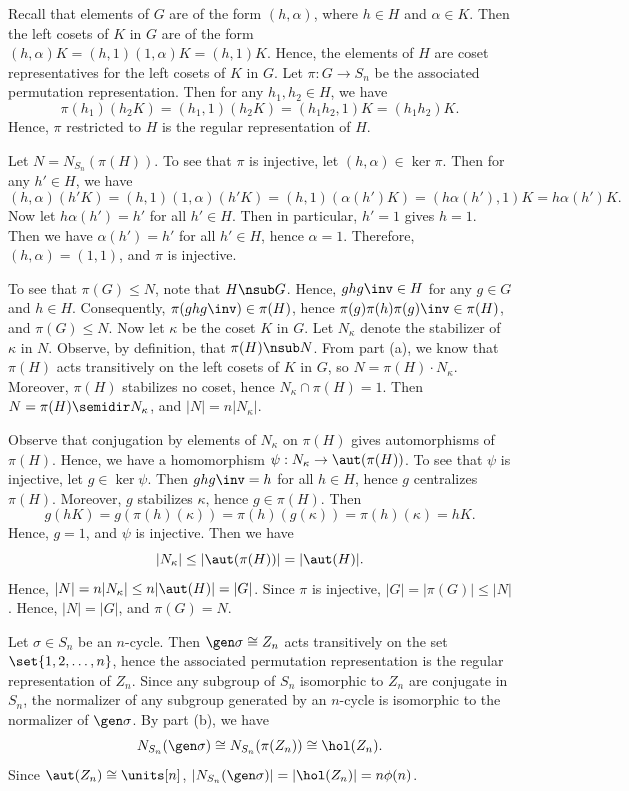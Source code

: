 \begin{solenum}
    \item Recall that elements of $G$ are of the form $(h, \alpha)$, where $h \in H$ and $\alpha \in K$.
	Then the left cosets of $K$ in $G$ are of the form $(h, \alpha)K = (h, 1)(1, \alpha)K = (h, 1)K$.
	Hence, the elements of $H$ are coset representatives for the left cosets of $K$ in $G$.
	Let $\pi : G \to S_n$ be the associated permutation representation.
	Then for any $h_1, h_2 \in H$, we have
    \[
    	\pi(h_1)(h_2K) = (h_1, 1)(h_2K) = (h_1h_2, 1)K = (h_1h_2)K.
    \]
    Hence, $\pi$ restricted to $H$ is the regular representation of $H$.
    \item Let $N = N_{S_n}(\pi(H))$.
	To see that $\pi$ is injective, let $(h, \alpha) \in \ker\pi$.
	Then for any $h' \in H$, we have
    \[
    	(h, \alpha)(h'K) = (h, 1)(1, \alpha)(h'K) = (h, 1)(\alpha(h')K) = (h\alpha(h'), 1)K = h\alpha(h')K.
    \]
    Now let $h\alpha(h') = h'$ for all $h' \in H$.
	Then in particular, $h' = 1$ gives $h = 1$.
	Then we have $\alpha(h') = h'$ for all $h' \in H$, hence $\alpha = 1$.
	Therefore, $(h, \alpha) = (1, 1)$, and $\pi$ is injective.

    To see that $\pi(G) \leq N$, note that $H \nsub G$.
	Hence, $ghg\inv \in H$ for any $g \in G$ and $h \in H$.
	Consequently, $\pi(ghg\inv) \in \pi(H)$, hence $\pi(g)\pi(h)\pi(g)\inv \in \pi(H)$, and $\pi(G) \leq N$.
	Now let $\kappa$ be the coset $K$ in $G$.
	Let $N_\kappa$ denote the stabilizer of $\kappa$ in $N$.
	Observe, by definition, that $\pi(H) \nsub N$.
	From part (a), we know that $\pi(H)$ acts transitively on the left cosets of $K$ in $G$, so $N = \pi(H) \cdot N_\kappa$.
	Moreover, $\pi(H)$ stabilizes no coset, hence $N_\kappa \cap \pi(H) = 1$.
	Then $N = \pi(H) \semidir N_\kappa$, and $|N| = n|N_\kappa|$.

    Observe that conjugation by elements of $N_\kappa$ on $\pi(H)$ gives automorphisms of $\pi(H)$.
	Hence, we have a homomorphism $\psi : N_\kappa \to \aut(\pi(H))$.
	To see that $\psi$ is injective, let $g \in \ker\psi$.
	Then $ghg\inv = h$ for all $h \in H$, hence $g$ centralizes $\pi(H)$.
	Moreover, $g$ stabilizes $\kappa$, hence $g \in \pi(H)$.
	Then
    \[
    	g(hK) = g(\pi(h)(\kappa)) = \pi(h)(g(\kappa)) = \pi(h)(\kappa) = hK.
    \]
    Hence, $g = 1$, and $\psi$ is injective.
	Then we have
    \[
    	|N_\kappa| \leq |\aut(\pi(H))| = |\aut(H)|.
    \]
    Hence, $|N| = n|N_\kappa| \leq n|\aut(H)| = |G|$.
	Since $\pi$ is injective, $|G| = |\pi(G)| \leq |N|$.
	Hence, $|N| = |G|$, and $\pi(G) = N$.
    \item Let $\sigma \in S_n$ be an $n$-cycle.
	Then $\gen\sigma \cong Z_n$ acts transitively on the set $\set{1, 2, \ldots, n}$, hence the associated permutation representation is the regular representation of $Z_n$.
	Since any subgroup of $S_n$ isomorphic to $Z_n$ are conjugate in $S_n$, the normalizer of any subgroup generated by an $n$-cycle is isomorphic to the normalizer of $\gen\sigma$.
	By part (b), we have
    \[
    	N_{S_n}(\gen\sigma) \cong N_{S_n}(\pi(Z_n)) \cong \hol(Z_n).
    \]
    Since $\aut(Z_n) \cong \units[n]$, $|N_{S_n}(\gen\sigma)| = |\hol(Z_n)| = n\phi(n)$.
\end{solenum}

